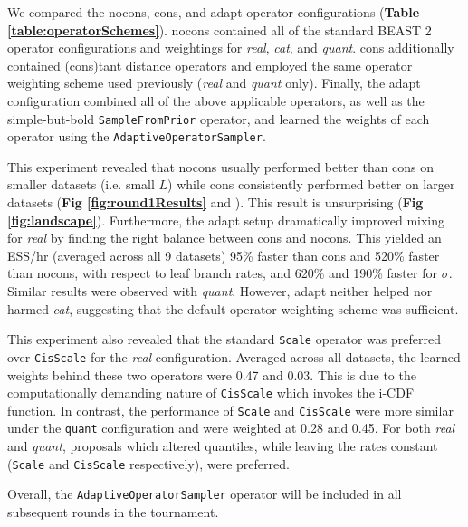 \documentclass[10pt,letterpaper]{article}
\begin{document}
We compared the nocons, cons, and adapt operator configurations (\textbf{Table \ref{table:operatorSchemes}}).
nocons contained all of the standard BEAST 2 operator configurations and weightings for \textit{real}, \textit{cat}, and \textit{quant}.
cons additionally contained (cons)tant distance operators and employed the same operator weighting scheme used previously \cite{zhang2020improving} (\textit{real} and \textit{quant} only). 
Finally, the adapt configuration combined all of the above applicable operators, as well as the simple-but-bold \texttt{SampleFromPrior} operator, and learned the weights of each operator using the  \texttt{AdaptiveOperatorSampler}.



This experiment revealed that nocons usually performed better than cons on smaller datasets (i.e. small $L$) while cons consistently performed better on larger datasets (\textbf{Fig \ref{fig:round1Results}} and \textbf{}). 
This result is unsurprising (\textbf{Fig \ref{fig:landscape}}).
Furthermore, the adapt setup dramatically improved mixing for \textit{real} by finding the right balance between cons and nocons.
This yielded an ESS/hr (averaged across all 9 datasets) 95\% faster than cons and 520\% faster than nocons, with respect to leaf branch rates, and 620\% and 190\% faster for $\sigma$.
Similar results were observed with \textit{quant}.
However, adapt neither helped nor harmed \textit{cat}, suggesting that the default operator weighting scheme was sufficient.


This experiment also revealed that the standard \texttt{Scale} operator was preferred over \texttt{CisScale} for the \textit{real} configuration. Averaged across all datasets, the learned weights behind these two operators were 0.47 and 0.03.
This is due to the computationally demanding nature of \texttt{CisScale} which invokes the i-CDF function.
In contrast, the performance of \texttt{Scale} and \texttt{CisScale} were more similar under the \texttt{quant} configuration and were weighted at 0.28 and 0.45.
For both \textit{real} and \textit{quant}, proposals which altered quantiles, while leaving the rates constant (\texttt{Scale} and \texttt{CisScale} respectively), were preferred.


Overall, the \texttt{AdaptiveOperatorSampler} operator will be included in all subsequent rounds in the tournament. 
\end{document}
